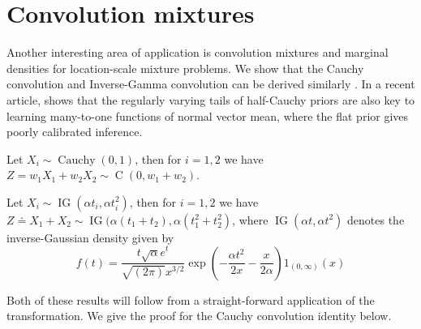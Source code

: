 \documentclass[lineno]{biometrika}
\begin{document}
\section{Convolution mixtures}

Another interesting area of application is convolution mixtures and marginal
densities for location-scale mixture problems. We show that the Cauchy
convolution \citep{pillai2015unexpected} and Inverse-Gamma convolution can be
derived similarly \citep{gelman_prior_2006, polson_halfcauchy_2012}.  In a recent 
article, \citet{bhadra_default_2016} shows that the regularly varying tails of
half-Cauchy priors are also key to learning many-to-one functions of normal
vector mean, where the flat prior gives poorly calibrated inference. 
\begin{lemma}
Let $X_i \sim \operatorname{Cauchy}(0,1)$, then for 
$i =1, 2$ we have 
$Z = w_1 X_1 + w_2 X_2 \sim \operatorname{C}\left( 0, w_1 + w_2 \right)$.
\end{lemma}

\begin{lemma}
Let $X_i \sim \operatorname{IG}(\alpha t_i, \alpha t_i^2)$, then for 
$i = 1, 2$ we have 
$Z \doteq X_1 + X_2 \sim \operatorname{IG}(\alpha (t_1 + t_2), \alpha (t_1^2+t_2^2)$, 
where $\operatorname{IG}(\alpha t, \alpha t^2)$ denotes the inverse-Gaussian 
density given by
$$
  f(t) = \frac{t \sqrt{\alpha} e^t}{\sqrt{(2 \pi)} x^{3/2}} 
  \exp\left( -\frac{\alpha t^2}{2x} - \frac{x}{2\alpha} \right) 1_{(0,\infty)}(x) 
$$
\end{lemma}

Both of these results will follow from a straight-forward application of the \CS{} 
transformation. We give the proof for the Cauchy convolution identity below.
\end{document}
